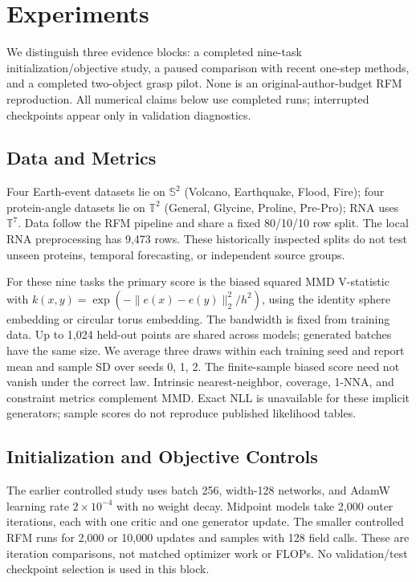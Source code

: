 \section{Experiments}
\label{sec:experiments}
We distinguish three evidence blocks: a completed nine-task initialization/objective study, a paused comparison with recent one-step methods, and a completed two-object grasp pilot. None is an original-author-budget RFM reproduction. All numerical claims below use completed runs; interrupted checkpoints appear only in validation diagnostics.

\subsection{Data and Metrics}
Four Earth-event datasets lie on $\mathbb S^2$ (Volcano, Earthquake, Flood, Fire); four protein-angle datasets lie on $\mathbb T^2$ (General, Glycine, Proline, Pre-Pro); RNA uses $\mathbb T^7$. Data follow the RFM pipeline and share a fixed 80/10/10 row split. The local RNA preprocessing has 9,473 rows. These historically inspected splits do not test unseen proteins, temporal forecasting, or independent source groups.

For these nine tasks the primary score is the biased squared MMD V-statistic with $k(x,y)=\exp(-\|e(x)-e(y)\|_2^2/h^2)$, using the identity sphere embedding or circular torus embedding. The bandwidth is fixed from training data. Up to 1,024 held-out points are shared across models; generated batches have the same size. We average three draws within each training seed and report mean and sample SD over seeds 0, 1, 2. The finite-sample biased score need not vanish under the correct law. Intrinsic nearest-neighbor, coverage, 1-NNA, and constraint metrics complement MMD. Exact NLL is unavailable for these implicit generators; sample scores do not reproduce published likelihood tables.

\subsection{Initialization and Objective Controls}
The earlier controlled study uses batch 256, width-128 networks, and AdamW learning rate $2\times10^{-4}$ with no weight decay. Midpoint models take 2,000 outer iterations, each with one critic and one generator update. The smaller controlled RFM runs for 2,000 or 10,000 updates and samples with 128 field calls. These are iteration comparisons, not matched optimizer work or FLOPs. No validation/test checkpoint selection is used in this block.

